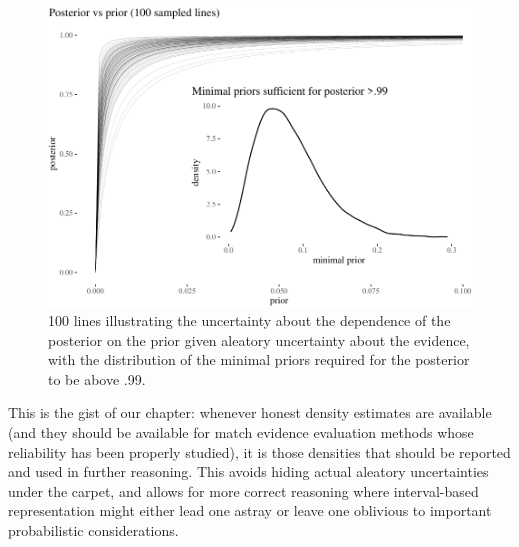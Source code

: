 \documentclass[
  10pt,
  dvipsnames,enabledeprecatedfontcommands]{scrartcl}
\begin{document}
\begin{figure}[H]


\begin{center}\includegraphics[width=0.8\linewidth]{chapter-outline_files/figure-latex/fig:lines3-1} \end{center}

\caption{100 lines illustrating the uncertainty about the dependence of the posterior on the prior given aleatory uncertainty about the evidence, with the distribution of the minimal priors required for the posterior to be above .99.}

\label{fig:lines}

\end{figure}


This is the gist of our chapter: whenever honest density estimates are
available (and they should be available for match evidence evaluation
methods whose reliability has been properly studied), it is those
densities that should be reported and used in further reasoning. This
avoids hiding actual aleatory uncertainties under the carpet, and allows
for more correct reasoning where interval-based representation might
either lead one astray or leave one oblivious to important probabilistic
considerations.
\end{document}

